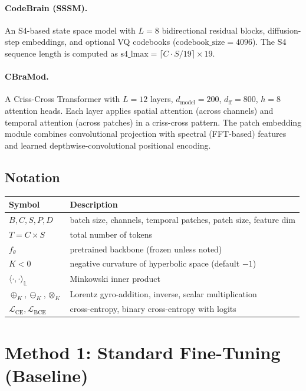 \documentclass{article}
\newcommand{\Lo}{\mathbb{L}}
\newcommand{\mL}{\mathcal{L}}
\newcommand{\inner}[2]{\langle #1, #2 \rangle}
\begin{document}
\paragraph{CodeBrain (SSSM).}
An S4-based state space model with $L = 8$ bidirectional residual blocks, diffusion-step embeddings, and optional VQ codebooks ($\text{codebook\_size} = 4096$).
The S4 sequence length is computed as $\text{s4\_lmax} = \lceil C \cdot S / 19 \rceil \times 19$.

\paragraph{CBraMod.}
A Criss-Cross Transformer with $L = 12$ layers, $d_\text{model} = 200$, $d_\text{ff} = 800$, $h = 8$ attention heads.
Each layer applies spatial attention (across channels) and temporal attention (across patches) in a criss-cross pattern.
The patch embedding module combines convolutional projection with spectral (FFT-based) features and learned depthwise-convolutional positional encoding.

\subsection{Notation}

\begin{table}[h]
\centering
\small
\begin{tabular}{@{}ll@{}}
\toprule
Symbol & Description \\
\midrule
$B, C, S, P, D$ & batch size, channels, temporal patches, patch size, feature dim \\
$T = C \times S$ & total number of tokens \\
$f_\theta$ & pretrained backbone (frozen unless noted) \\
$K < 0$ & negative curvature of hyperbolic space (default $-1$) \\
$\inner{\cdot}{\cdot}_\Lo$ & Minkowski inner product \\
$\oplus_K, \ominus_K, \otimes_K$ & Lorentz gyro-addition, inverse, scalar multiplication \\
$\mL_\text{CE}, \mL_\text{BCE}$ & cross-entropy, binary cross-entropy with logits \\
\bottomrule
\end{tabular}
\end{table}

\section{Method 1: Standard Fine-Tuning (Baseline)}
\label{sec:baseline}
\end{document}
